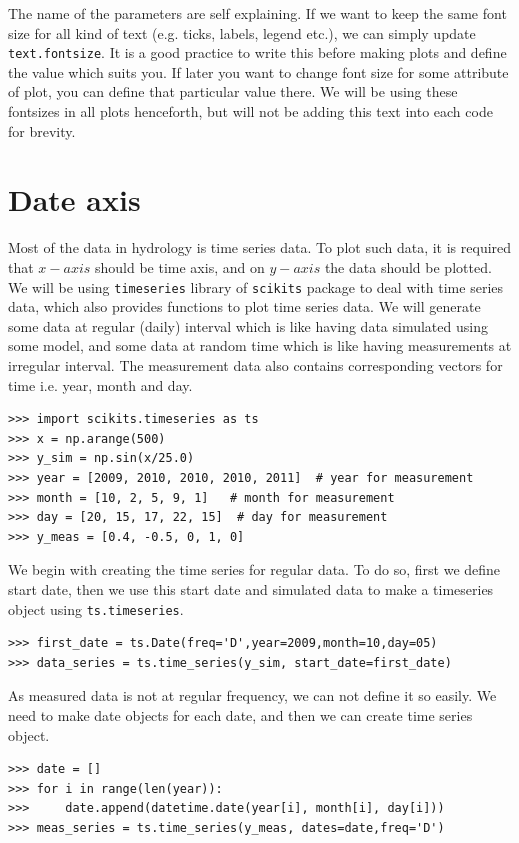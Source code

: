 \documentclass[10pt]{book}
\begin{document}
The name of the parameters are self explaining. If we want to keep the same font size for all kind of text (e.g. ticks, labels, legend etc.), we can simply update \verb"text.fontsize". It is a good practice to write this before making plots and define the value which suits you. If later you want to change font size for some attribute of plot, you can define that particular value there. We will be using these fontsizes in all plots henceforth, but will not be adding this text into each code for brevity. \\

\section{Date axis}
Most of the data in hydrology is time series data. To plot such data, it is required that $x-axis$ should be time axis, and on $y-axis$ the data should be plotted. We will be using \verb"timeseries" library of \verb"scikits" package to deal with time series data, which also provides functions to plot time series data. We will generate some data at regular (daily) interval which is like having data simulated using some model, and some data at random time which is like having measurements at irregular interval. The measurement data also contains corresponding vectors for time i.e. year, month and day.

\beforeverb \begin{verbatim}
>>> import scikits.timeseries as ts
>>> x = np.arange(500)
>>> y_sim = np.sin(x/25.0)
>>> year = [2009, 2010, 2010, 2010, 2011]  # year for measurement
>>> month = [10, 2, 5, 9, 1]   # month for measurement
>>> day = [20, 15, 17, 22, 15]  # day for measurement
>>> y_meas = [0.4, -0.5, 0, 1, 0]
\end{verbatim} \afterverb

We begin with creating the time series for regular data. To do so, first we define start date, then we use this start date and simulated data to make a timeseries object using \verb"ts.timeseries". 
\beforeverb \begin{verbatim}
>>> first_date = ts.Date(freq='D',year=2009,month=10,day=05)
>>> data_series = ts.time_series(y_sim, start_date=first_date)
\end{verbatim} \afterverb
As measured data is not at regular frequency, we can not define it so easily. We need to make date objects for each date, and then we can create time series object. 

\beforeverb \begin{verbatim}
>>> date = []
>>> for i in range(len(year)):
>>>     date.append(datetime.date(year[i], month[i], day[i]))
>>> meas_series = ts.time_series(y_meas, dates=date,freq='D')
\end{verbatim} \afterverb
\end{document}
